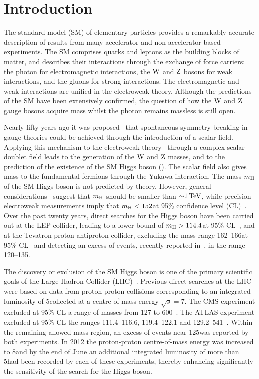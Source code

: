 \documentclass[11pt,twoside,a4paper,cmspaper,final]{cms-tdr}
\begin{document}
\section{Introduction}\label{sec:Intro}

The standard model (SM) of elementary particles provides a remarkably
accurate description of results from many accelerator and non-accelerator based experiments. The
SM comprises quarks and leptons as the building blocks of matter,
and describes their interactions through the exchange of force carriers: the photon for electromagnetic
interactions, the $\mathrm{W}$ and $\mathrm{Z}$ bosons for weak interactions, and the gluons for strong interactions.
The electromagnetic and weak interactions are unified in
the electroweak theory. Although the predictions of the
SM have been extensively confirmed, the question of how the $\mathrm{W}$ and $\mathrm{Z}$ gauge bosons acquire
mass whilst the photon remains massless
is still open.

Nearly fifty years ago it was
proposed~\cite{Englert:1964et,Higgs:1964ia,Higgs:1964pj,Guralnik:1964eu,Higgs:1966ev,Kibble:1967sv}
that spontaneous symmetry breaking in gauge theories could be achieved
through the introduction of a scalar field. Applying
this mechanism to the
electroweak theory~\cite{Glashow:1961tr,Weinberg:1967tq,sm_salam} through a complex scalar doublet field
leads to the
generation of the $\mathrm{W}$ and $\mathrm{Z}$ masses, and to the prediction of the existence of the SM
Higgs boson (\PH). The scalar field also gives mass to the fundamental
fermions through the Yukawa interaction. The mass
$m_{\mathrm{H}}$ of the SM Higgs boson is not predicted by
theory.
However, general considerations~\cite{Cornwall:1973tb,Cornwall:1974km,LlewellynSmith:1973ey,Lee:1977eg}
suggest that $m_{\mathrm{H}}$ should be smaller than ${\sim}1\,\text{Te\hspace{-.08em}V}$, while precision electroweak
measurements imply that $m_{\mathrm{H}} < 152$\GeV at 95\% confidence level (CL)~\cite{EWKlimits}. Over the
past twenty years, direct searches for the Higgs boson have been carried out at the LEP collider,
leading to a lower bound of $m_{\mathrm{H}} > 114.4$\GeV at 95\% CL~\cite{LEPlimits}, and at the Tevatron
proton-antiproton collider, excluding the mass range 162--166\GeV at 95\% CL~\cite{TEVHIGGS_2010} and detecting an excess of events, recently reported in~\cite{CDF:Hbb,CDFD0:HbbCombined,D0CombHbb}, in the range 120--135\GeV.

The discovery or exclusion of the SM Higgs boson is one of the primary scientific goals of the Large Hadron Collider (LHC)~\cite{lhc}.
Previous direct searches at the LHC were based on data from proton-proton collisions corresponding to
an integrated luminosity of 5\fbinv collected at a centre-of-mass
energy $\sqrt{s}=7$\TeV.
The CMS experiment excluded
at 95\% CL a range of masses from 127 to 600\GeV~\cite{Chatrchyan:2012tx}.
The ATLAS experiment excluded at 95\% CL the ranges 111.4--116.6,
119.4--122.1 and 129.2--541\GeV~\cite{ATLAScombJul2012_7TeV}.
Within the remaining allowed mass region, an excess of events near
125\GeV was reported by both experiments.
In 2012 the proton-proton centre-of-mass energy was increased to 8\TeV and by the end of June
an additional integrated luminosity of more than 5\fbinv had been
recorded by each of these experiments,
thereby enhancing significantly the sensitivity of the search for the Higgs boson.
\end{document}
